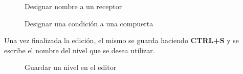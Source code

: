 \documentclass[a4paper]{article}
\begin{document}
\begin{figure}[!h]
	\caption{Designar nombre a un receptor}
	\label{fig:diagrama22}
\end{figure}

\begin{figure}[!h]
	\caption{Designar una condición a una compuerta}
	\label{fig:diagrama23}
\end{figure}

\newpage

Una vez finalizada la edición, el mismo se guarda haciendo \textbf{CTRL+S} y se escribe el nombre del nivel que se desea utilizar.

\begin{figure}[!h]
	\caption{Guardar un nivel en el editor}
	\label{fig:diagrama24}
\end{figure}
\end{document}
